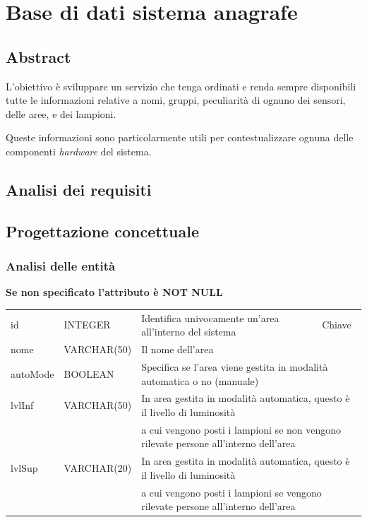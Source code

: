 \section{Base di dati sistema anagrafe}

\subsection{Abstract}

L'obiettivo è sviluppare un servizio che tenga ordinati e renda sempre disponibili tutte le informazioni relative a nomi, gruppi, peculiarità di ognuno dei sensori, delle aree, e dei lampioni. 

Queste informazioni sono particolarmente utili per contestualizzare ognuna delle componenti {\it{hardware}} del sistema.

\subsection{Analisi dei requisiti}

\subsection{Progettazione concettuale}

\subsubsection{Analisi delle entità}

\textbf{Se non specificato l'attributo è NOT NULL}

\begin{center}
    \begin{tabularx}{\textwidth}{|l|l|l|X|}
        \hline
        \rowcolor{gray!30}
        \multicolumn{4}{|c|}{\textbf{AREA}}\\
        \hline
        id & INTEGER & Identifica univocamente un'area all'interno del sistema & Chiave\\
        \hline
        nome & VARCHAR(50) & \multicolumn{2}{l|}{Il nome dell'area} \\
        \hline
        autoMode & BOOLEAN & \multicolumn{2}{l|}{Specifica se l'area viene gestita in modalità automatica o no (manuale)} \\
        \hline
        lvlInf & VARCHAR(50) & \multicolumn{2}{l|}{In area gestita in modalità automatica, questo è il livello di luminosità} \\ & & \multicolumn{2}{l|}{a cui vengono posti i lampioni se non vengono rilevate persone all'interno dell'area} \\
        \hline
        lvlSup & VARCHAR(20) & \multicolumn{2}{l|}{In area gestita in modalità automatica, questo è il livello di luminosità} \\ & & \multicolumn{2}{l|}{a cui vengono posti i lampioni se vengono rilevate persone all'interno dell'area} \\
        \hline
    \end{tabularx}
\end{center}

